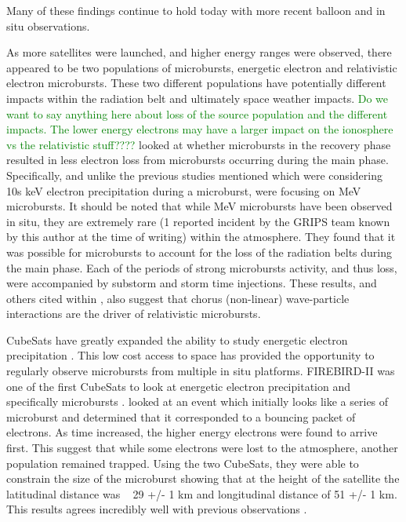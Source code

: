 \documentclass[referee,a4paper,12pt,traditabstract]{swsc}
\begin{document}
\begin{linenumbers}
\noindent Many of these findings continue to hold today with more recent balloon and in situ observations. 

As more satellites were launched, and higher energy ranges were observed, there appeared to be two populations of microbursts, energetic electron and relativistic electron microbursts. These two different populations have potentially different impacts within the radiation belt and ultimately space weather impacts. \textcolor{green}{Do we want to say anything here about loss of the source population and the different impacts. The lower energy electrons may have a larger impact on the ionosphere vs the relativistic stuff???? } \citet{Obrien2004} looked at whether microbursts in the recovery phase resulted in less electron loss from microbursts occurring during the main phase. Specifically, and unlike the previous studies mentioned which were considering 10s keV electron precipitation during a microburst, \citet{Obrien2004} were focusing on MeV microbursts. It should be noted that while MeV microbursts have been observed in situ, they are extremely rare (1 reported incident by the GRIPS team known by this author at the time of writing) within the atmosphere. They found that it was possible for microbursts to account for the loss of the radiation belts during the main phase. Each of the periods of strong microbursts activity, and thus loss, were accompanied by substorm and storm time injections. These results, and others cited within \citet{Obrien2004}, also suggest that chorus (non-linear) wave-particle interactions are the driver of relativistic microbursts. 

CubeSats have greatly expanded the ability to study energetic electron precipitation \citep[e.g.][]{Crew2016}. This low cost access to space has provided the opportunity to regularly observe microbursts from multiple in situ platforms. FIREBIRD-II was one of the first CubeSats to look at energetic electron precipitation and specifically microbursts \citep{Crew2016}.  \citet{Shumko2018a} looked at an event which initially looks like a series of microburst and determined that it corresponded to a bouncing packet of electrons. As time increased, the higher energy electrons were found to arrive first. This suggest that while some electrons were lost to the atmosphere, another population remained trapped. Using the two CubeSats, they were able to constrain the size of the microburst showing that at the height of the satellite the latitudinal distance was ~ 29 +/- 1 km and longitudinal distance of 51 +/- 1 km. This results agrees incredibly well with previous observations \citep[e.g.][and references therein]{Parks1967, Lampton1967, Milton1967, Parks1978}. 



\end{linenumbers}
\end{document}
